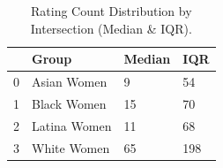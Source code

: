 \begin{table}[htbp]
\centering
\caption{Rating Count Distribution by Intersection (Median & IQR).}
\label{tab:eda_rating_count_by_group}
\begin{tabular}{llll}
\toprule
 & Group & Median & IQR \\
\midrule
0 & Asian Women & 9 & 54 \\
1 & Black Women & 15 & 70 \\
2 & Latina Women & 11 & 68 \\
3 & White Women & 65 & 198 \\
\bottomrule
\end{tabular}

\end{table}